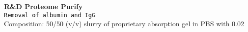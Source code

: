 \textbf{R&D Proteome Purify} 
\\
\texttt{Removal of albumin and IgG}
\\
Composition: 50/50 (v/v) slurry of proprietary absorption gel in PBS with 0.02\
